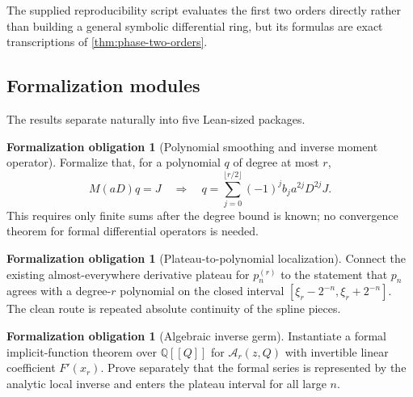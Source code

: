 \documentclass[11pt,oneside]{article}
\numberwithin{equation}{section}
\theoremstyle{definition}
\newtheorem{obligation}[theorem]{Formalization obligation}
\theoremstyle{remark}
\newcommand{\Q}{\mathbb Q}
\begin{document}
The supplied reproducibility script evaluates the first two orders directly rather than
building a general symbolic differential ring, but its formulas are exact transcriptions of
\cref{thm:phase-two-orders}.

\subsection{Formalization modules}

The results separate naturally into five Lean-sized packages.

\begin{obligation}[Polynomial smoothing and inverse moment operator]
Formalize that, for a polynomial $q$ of degree at most $r$,
\[
 M(aD)q=J \quad\Longrightarrow\quad
 q=\sum_{j=0}^{\lfloor r/2\rfloor}(-1)^jb_ja^{2j}D^{2j}J.
\]
This requires only finite sums after the degree bound is known; no convergence theorem for
formal differential operators is needed.
\end{obligation}

\begin{obligation}[Plateau-to-polynomial localization]
Connect the existing almost-everywhere derivative plateau for $p_n^{(r)}$ to the statement
that $p_n$ agrees with a degree-$r$ polynomial on the closed interval
$[\xi_r-2^{-n},\xi_r+2^{-n}]$.  The clean route is repeated absolute continuity of the
spline pieces.
\end{obligation}

\begin{obligation}[Algebraic inverse germ]
Instantiate a formal implicit-function theorem over $\Q[[Q]]$ for
$\mathcal A_r(z,Q)$ with invertible linear coefficient $F'(x_r)$.  Prove separately that
the formal series is represented by the analytic local inverse and enters the plateau interval
for all large $n$.
\end{obligation}
\end{document}
